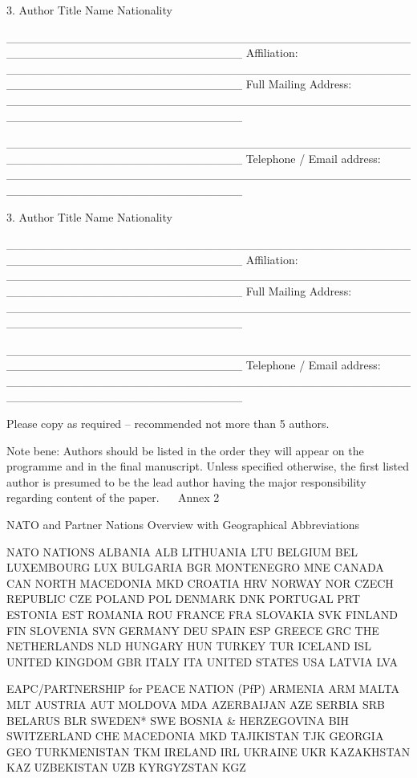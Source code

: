 3. Author Title			Name						Nationality

____________________________________________________________________________
Affiliation: ____________________________________________________________________________
Full Mailing Address: ____________________________________________________________________________

____________________________________________________________________________
Telephone / Email address: ____________________________________________________________________________


3. Author Title			Name						Nationality

____________________________________________________________________________
Affiliation: ____________________________________________________________________________
Full Mailing Address: ____________________________________________________________________________

____________________________________________________________________________
Telephone / Email address: ____________________________________________________________________________

Please copy as required – recommended not more than 5 authors.



Note bene:
Authors should be listed in the order they will appear on the programme and in the final manuscript. Unless specified otherwise, the first listed author is presumed to be the lead author having the major responsibility regarding content of the paper. 
 
Annex 2

NATO and Partner Nations Overview
 with Geographical Abbreviations

NATO NATIONS
ALBANIA	ALB	LITHUANIA	LTU
BELGIUM	BEL	LUXEMBOURG	LUX
BULGARIA	BGR	MONTENEGRO	MNE
CANADA	CAN	NORTH MACEDONIA	MKD
CROATIA	HRV	NORWAY	NOR
CZECH REPUBLIC	CZE	POLAND	POL
DENMARK	DNK	PORTUGAL	PRT
ESTONIA	EST	ROMANIA	ROU
FRANCE	FRA	SLOVAKIA	SVK
FINLAND	FIN	SLOVENIA	SVN
GERMANY	DEU	SPAIN	ESP
GREECE	GRC	THE NETHERLANDS	NLD
HUNGARY	HUN	TURKEY	TUR
ICELAND	ISL	UNITED KINGDOM	GBR
ITALY	ITA	UNITED STATES	USA
LATVIA	LVA		

EAPC/PARTNERSHIP for PEACE NATION (PfP)
ARMENIA	ARM	MALTA	MLT
AUSTRIA	AUT	MOLDOVA	MDA
AZERBAIJAN	AZE	SERBIA	SRB
BELARUS	BLR	SWEDEN*	SWE
BOSNIA & HERZEGOVINA	BIH	SWITZERLAND	CHE
MACEDONIA	MKD	TAJIKISTAN	TJK
GEORGIA	GEO	TURKMENISTAN	TKM
IRELAND	IRL	UKRAINE	UKR
KAZAKHSTAN	KAZ	UZBEKISTAN	UZB
KYRGYZSTAN	KGZ		





